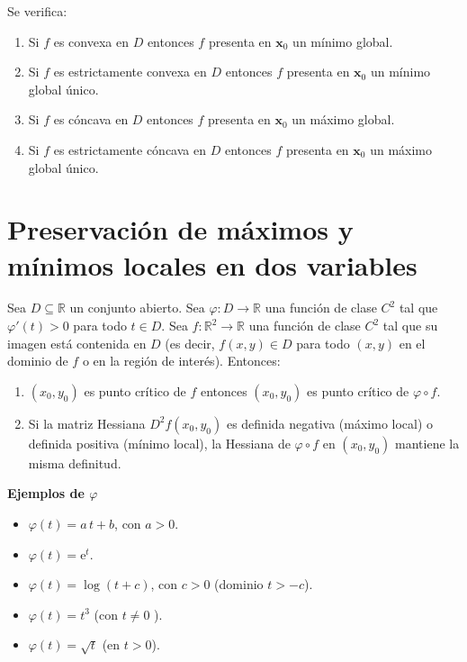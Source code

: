 \documentclass{article}
\begin{document}
Se verifica:
\begin{enumerate}
    \item Si \( f \) es convexa en \( D \) entonces \( f \) presenta en \( \mathbf{x}_0 \) un mínimo global.
    \item Si \( f \) es estrictamente convexa en \( D \) entonces \( f \) presenta en \( \mathbf{x}_0 \) un mínimo global único.
    \item Si \( f \) es cóncava en \( D \) entonces \( f \) presenta en \( \mathbf{x}_0 \) un máximo global.
    \item Si \( f \) es estrictamente cóncava en \( D \) entonces \( f \) presenta en \( \mathbf{x}_0 \) un máximo global único.
\end{enumerate}



\section*{Preservación de máximos y mínimos locales en dos variables}


Sea $D \subseteq \mathbb{R}$ un conjunto abierto. Sea $\varphi: D \to \mathbb{R}$ una función de clase $C^2$ tal que $\varphi'(t)>0$ para todo $t \in D$. Sea $f:\mathbb{R}^2 \to \mathbb{R}$ una función de clase $C^2$ tal que su imagen está contenida en $D$ (es decir, $f(x,y) \in D$ para todo $(x,y)$ en el dominio de $f$ o en la región de interés).
Entonces:

\begin{enumerate}
  \item \((x_0,y_0)\) es punto crítico de \(f\) entonces \((x_0,y_0)\) es punto crítico de \(\varphi\circ f\).
  \item Si la matriz Hessiana \(D^2f(x_0,y_0)\) es definida negativa (máximo local) o definida positiva (mínimo local), la Hessiana de \(\varphi\circ f\) en \((x_0,y_0)\) mantiene la misma definitud.
\end{enumerate}

\medskip


\noindent\textbf{Ejemplos de \(\varphi\)}
\begin{itemize}
  \item \(\varphi(t)=a\,t + b\), con \(a>0\).
  \item \(\varphi(t)=\mathrm{e}^t\).
  \item \(\varphi(t)=\log(t + c)\), con \(c>0\) (dominio \(t>-c\)).
  \item \(\varphi(t)=t^3\) (con $t\neq0$ ).
  \item \(\varphi(t)=\sqrt{t}\) (en \(t>0\)).
\end{itemize}
\end{document}
